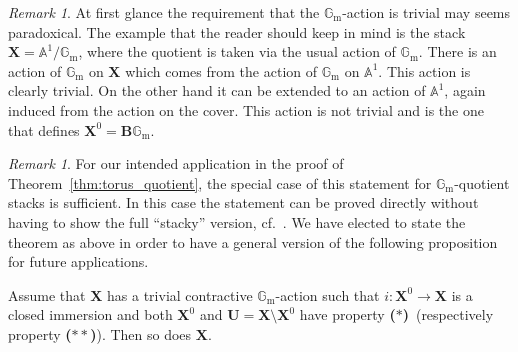 \documentclass{oupau}
\theoremstyle{remark}
\newtheorem{remark}[theorem]{Remark}
\newcommand\as[2][]{\mathbb A^{#2}_{#1}}    %
\newcommand\Gm{\mathbb{G}_{\mathrm{m}}}     %
\let\stack\mathbf                           %
\newcommand\cs{\stack{B}}                   %
\newcommand\bc{\textbf{($\mathbf{*}$)}}
\newcommand\hbc{\textbf{($\mathbf{**}$)}}
\begin{document}
\begin{remark}
    At first glance the requirement that the $\Gm$-action is trivial may seems paradoxical.
    The example that the reader should keep in mind is the stack $\stack X = \as1/\Gm$, where the quotient is taken via the usual action of $\Gm$.
    There is an action of $\Gm$ on $\stack X$ which comes from the action of $\Gm$ on $\as 1$.
    This action is clearly trivial.
    On the other hand it can be extended to an action of $\as 1$, again induced from the action on the cover.
    This action is not trivial and is the one that defines $\stack X^0 = \cs{\Gm}$.
\end{remark}

\begin{remark}
  For our intended application in the proof of Theorem~\ref{thm:torus_quotient}, the special case of this statement for $\Gm$-quotient stacks is sufficient.
  In this case the statement can be proved directly without having to show the full \enquote{stacky} version, cf.~\cite[Proposition~5.3.2]{DrinfeldGaitsgory:2015:CompactGenerationOfDModOnBunG}.
  We have elected to state the theorem as above in order to have a general version of the following proposition for future applications.
\end{remark}

\begin{proposition}\label{prop:contractive}
    Assume that $\stack X$ has a trivial contractive $\Gm$-action such that $i\colon \stack X^0 \to \stack X$ is a closed immersion and both $\stack X^0$ and $\stack U = \stack X\setminus \stack X^0$ have property \bc\ (respectively property \hbc).
    Then so does $\stack X$.
\end{proposition}
\end{document}
